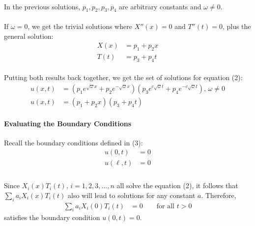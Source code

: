 \documentclass[letter]{article}
\begin{document}
    \paragraph{} In the previous solutions, $p_1,p_2,p_3,p_4$ are arbitrary constants and $\omega\neq0$.
    \paragraph{} If $\omega=0$, we get the trivial solutions where $X''(x)=0$ and $T''(t)=0$, plus the general solution:
    \begin{equation}
        \begin{split}
            X(x) &= p_1+p_2x\\
            T(t) &= p_3+p_4t
        \end{split}
    \end{equation}
    \paragraph{}Putting both results back together, we get the set of solutions for equation (2):
    \begin{equation}
        \begin{split}
            u(x,t) 
            &= (p_1e^{\sqrt{\omega}x}+p_2e^{-\sqrt{\omega}x})(p_3e^{c\sqrt{\omega}t}+p_4e^{-c\sqrt{\omega}t})\text{, }\omega \neq 0\\
            u(x,t) 
            &= (p_1+p_2x)(p_3+p_4t)
        \end{split}
    \end{equation}
    
    
    \paragraph{}\textbf{Evaluating the Boundary Conditions}
    \paragraph{}Recall the boundary conditions defined in (3):
        \begin{equation*}
        \begin{split}
            u(0,t) &= 0\\
            u(\ell,t) &= 0\\
        \end{split}
    \end{equation*}
    \paragraph{}Since $X_i(x)T_i(t)$, $i=1,2,3,...,n$ all solve the equation (2), it follows that $\sum_i a_i X_i(x)T_i(t)$ also will lead to solutions for any constant $a$. Therefore,
    \begin{equation}
        \begin{split}
            \sum_i a_i X_i(0)T_i(t) &= 0 \qquad \text{for all } t>0
        \end{split}
    \end{equation}
    satisfies the boundary condition $u(0,t)=0$.
\end{document}
